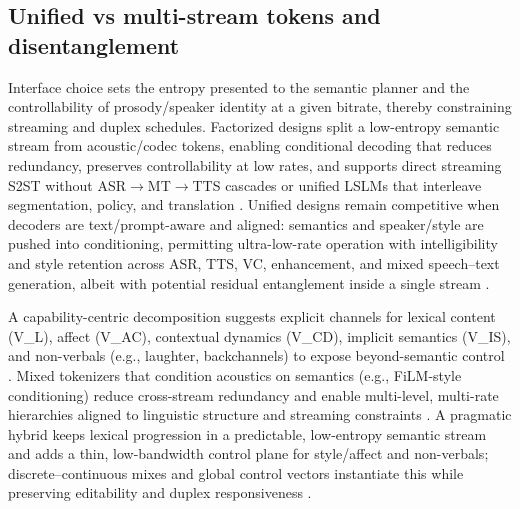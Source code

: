 \documentclass{article}
\begin{document}
\subsection{Unified vs multi-stream tokens and disentanglement} \label{subsec:unifiedvsmulti-streamtokensanddisentanglement}

Interface choice sets the entropy presented to the semantic planner and the controllability of prosody/speaker identity at a given bitrate, thereby constraining streaming and duplex schedules. Factorized designs split a low-entropy semantic stream from acoustic/codec tokens, enabling conditional decoding that reduces redundancy, preserves controllability at low rates, and supports direct streaming S2ST without ASR$\rightarrow$MT$\rightarrow$TTS cascades or unified LSLMs that interleave segmentation, policy, and translation \cite{guo2025streamuniachievingstreamingspeechtransla,zhao2024textlessstreamingspeechtranslationsemant,yang2025diffsoundstreamefficientspeechtokenizati}. Unified designs remain competitive when decoders are text/prompt-aware and aligned: semantics and speaker/style are pushed into conditioning, permitting ultra-low-rate operation with intelligibility and style retention across ASR, TTS, VC, enhancement, and mixed speech--text generation, albeit with potential residual entanglement inside a single stream \cite{wang2025tadicodectextawarediffusionspeechtokeniz,wu2024speechcomposerunifyingmultiplespeechtask}.

A capability-centric decomposition suggests explicit channels for lexical content (V_L), affect (V_AC), contextual dynamics (V_CD), implicit semantics (V_IS), and non-verbals (e.g., laughter, backchannels) to expose beyond-semantic control \cite{wang2025bossbeyondsemanticspeech}. Mixed tokenizers that condition acoustics on semantics (e.g., FiLM-style conditioning) reduce cross-stream redundancy and enable multi-level, multi-rate hierarchies aligned to linguistic structure and streaming constraints \cite{yang2025diffsoundstreamefficientspeechtokenizati}. A pragmatic hybrid keeps lexical progression in a predictable, low-entropy semantic stream and adds a thin, low-bandwidth control plane for style/affect and non-verbals; discrete--continuous mixes and global control vectors instantiate this while preserving editability and duplex responsiveness \cite{yang2025diffsoundstreamefficientspeechtokenizati}.
\end{document}
